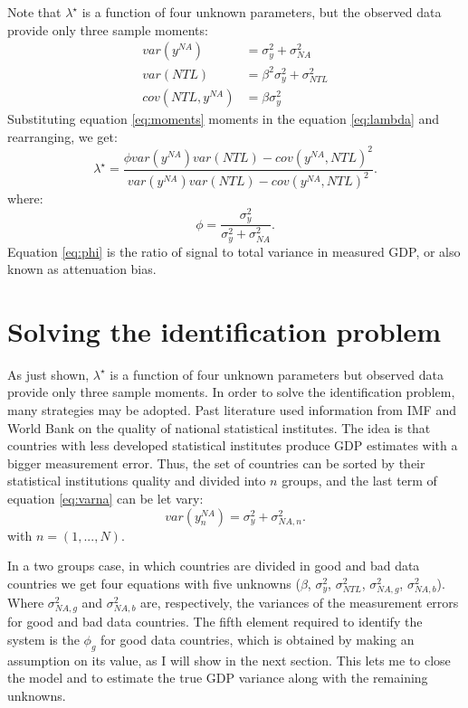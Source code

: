 Note that $\lambda^\star$ is a function of four unknown parameters, but the observed data provide only three sample moments:
\begin{subequations}
\label{eq:moments}
\begin{align}
\label{eq:varna}
var(y^{NA}) & = \sigma^2_y + \sigma^2_{NA} \\
\label{eq:momenttwo}
var(NTL) &= \beta^2\sigma^2_y+\sigma^2_{NTL} \\
\label{eq:betamoments}
cov(NTL,y^{NA}) &= \beta \sigma^2_y
\end{align}
\end{subequations}
 Substituting equation \ref{eq:moments} moments in the equation \ref{eq:lambda} and rearranging, we get:
 \begin{equation}
     \lambda^\star=\frac{\phi var(y^{NA})var(NTL)-cov(y^{NA},NTL)^2}{var(y^{NA})var(NTL)-cov(y^{NA},NTL)^2}.
 \end{equation}
 where:
 \begin{equation}
 \label{eq:phi}
     \phi=\frac{\sigma^2_y}{\sigma^2_y+\sigma^2_{NA}}.
 \end{equation}
 Equation \ref{eq:phi} is the ratio of signal to total variance in measured GDP, or also known as attenuation bias.
 \section{Solving the identification problem}
 As just shown, $\lambda^{\star}$ is a function of four unknown parameters but observed data provide only three sample moments. In order to solve the identification problem, many strategies may be adopted. Past literature used information from IMF and World Bank on the quality of national statistical institutes. The idea is that countries with less developed statistical institutes produce GDP estimates with a bigger measurement error. 
 Thus, the set of countries can be sorted by their statistical institutions quality and divided into $n$ groups, and the last term of equation \ref{eq:varna} can be let vary:
 \begin{equation}
 \label{eq:vargood}
     var(y^{NA}_n)=\sigma^2_y+\sigma^2_{NA,n}.
 \end{equation}
 with $n=(1,...,N)$.
 
 In a two groups case, in which countries are divided in good and bad data countries we get four equations with five unknowns ($\beta$, $\sigma^2_y$, $\sigma^2_{NTL}$, $\sigma^2_{NA,g}$, $\sigma^2_{NA,b}$).
 Where $\sigma^2_{NA,g}$ and $\sigma^2_{NA,b}$ are, respectively, the variances of the measurement errors for good and bad data countries.
  The fifth element required to identify the system is the $\phi_g$ for good data countries, which is obtained by  making an assumption on its value, as I will show in the next section.
 This lets me to close the model and to estimate the true GDP variance along with the remaining unknowns.
